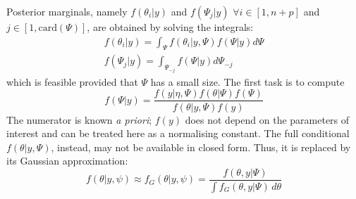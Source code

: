 \documentclass{book}
\begin{document}
Posterior marginals, namely $f(\theta_i | y)$ and $f(\Psi_j | y)$  $\forall i \in [1, n+p]$ and $j \in [1, \mathrm{card}(\Psi)]$, are obtained by solving the integrals:
 \begin{equation}
 \label{eq:marginals}
 \begin{aligned}
 f(\theta_i | y) = \int_{\Psi} f(\theta_i | y, \Psi) f(\Psi | y) d \Psi\\
 f(\Psi_j|y) = \int_{\Psi_{-j}} f(\Psi | y) d\Psi_{-j}
 \end{aligned}
 \end{equation}
which is feasible provided that $\Psi$ has a small size. 
The first task is to compute
 $$
f(\Psi | y) =  \frac{f(y | \eta, \Psi) f(\theta | \Psi) f(\Psi)}{f(\theta | y, \Psi)f(y)} 
 $$
 The numerator is known \textit{a priori}; $f(y)$ does not depend on the parameters of interest and can be treated here as a normalising constant. The full conditional $f(\theta | y, \Psi)$, instead, may not be available in closed form. Thus, it is replaced by its Gaussian approximation:
\begin{equation}
\label{eq:GaussianApprox}
f(\theta | y, \psi) \approx f_{G}(\theta | y, \psi) = \frac{f(\theta, y | \Psi)}{\int f_G(\theta, y | \Psi) \, d\theta}
\end{equation}
\end{document}
